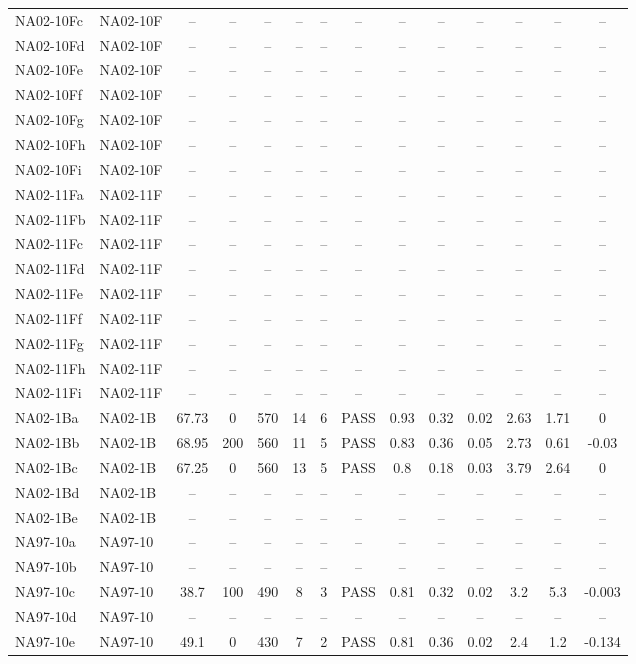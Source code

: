 \documentclass[draft]{agujournal2019}
\begin{document}
\begin{landscape}
\begin{longtable}{llcccccccccccc}
NA02-10Fc	&	NA02-10F	&	–	&	–	&	–	&	–	&	–	&	–	&	–	&	–	&	–	&	–	&	–	&	–	\\
NA02-10Fd	&	NA02-10F	&	–	&	–	&	–	&	–	&	–	&	–	&	–	&	–	&	–	&	–	&	–	&	–	\\
NA02-10Fe	&	NA02-10F	&	–	&	–	&	–	&	–	&	–	&	–	&	–	&	–	&	–	&	–	&	–	&	–	\\
NA02-10Ff	&	NA02-10F	&	–	&	–	&	–	&	–	&	–	&	–	&	–	&	–	&	–	&	–	&	–	&	–	\\
NA02-10Fg	&	NA02-10F	&	–	&	–	&	–	&	–	&	–	&	–	&	–	&	–	&	–	&	–	&	–	&	–	\\
NA02-10Fh	&	NA02-10F	&	–	&	–	&	–	&	–	&	–	&	–	&	–	&	–	&	–	&	–	&	–	&	–	\\
NA02-10Fi	&	NA02-10F	&	–	&	–	&	–	&	–	&	–	&	–	&	–	&	–	&	–	&	–	&	–	&	–	\\
NA02-11Fa	&	NA02-11F	&	–	&	–	&	–	&	–	&	–	&	–	&	–	&	–	&	–	&	–	&	–	&	–	\\
NA02-11Fb	&	NA02-11F	&	–	&	–	&	–	&	–	&	–	&	–	&	–	&	–	&	–	&	–	&	–	&	–	\\
NA02-11Fc	&	NA02-11F	&	–	&	–	&	–	&	–	&	–	&	–	&	–	&	–	&	–	&	–	&	–	&	–	\\
NA02-11Fd	&	NA02-11F	&	–	&	–	&	–	&	–	&	–	&	–	&	–	&	–	&	–	&	–	&	–	&	–	\\
NA02-11Fe	&	NA02-11F	&	–	&	–	&	–	&	–	&	–	&	–	&	–	&	–	&	–	&	–	&	–	&	–	\\
NA02-11Ff	&	NA02-11F	&	–	&	–	&	–	&	–	&	–	&	–	&	–	&	–	&	–	&	–	&	–	&	–	\\
NA02-11Fg	&	NA02-11F	&	–	&	–	&	–	&	–	&	–	&	–	&	–	&	–	&	–	&	–	&	–	&	–	\\
NA02-11Fh	&	NA02-11F	&	–	&	–	&	–	&	–	&	–	&	–	&	–	&	–	&	–	&	–	&	–	&	–	\\
NA02-11Fi	&	NA02-11F	&	–	&	–	&	–	&	–	&	–	&	–	&	–	&	–	&	–	&	–	&	–	&	–	\\
NA02-1Ba	&	NA02-1B	&	67.73	&	0	&	570	&	14	&	6	&	PASS	&	0.93	&	0.32	&	0.02	&	2.63	&	1.71	&	0	\\
NA02-1Bb	&	NA02-1B	&	68.95	&	200	&	560	&	11	&	5	&	PASS	&	0.83	&	0.36	&	0.05	&	2.73	&	0.61	&	-0.03	\\
NA02-1Bc	&	NA02-1B	&	67.25	&	0	&	560	&	13	&	5	&	PASS	&	0.8	&	0.18	&	0.03	&	3.79	&	2.64	&	0	\\
NA02-1Bd	&	NA02-1B	&	–	&	–	&	–	&	–	&	–	&	–	&	–	&	–	&	–	&	–	&	–	&	–	\\
NA02-1Be	&	NA02-1B	&	–	&	–	&	–	&	–	&	–	&	–	&	–	&	–	&	–	&	–	&	–	&	–	\\
NA97-10a	&	NA97-10	&	–	&	–	&	–	&	–	&	–	&	–	&	–	&	–	&	–	&	–	&	–	&	–	\\
NA97-10b	&	NA97-10	&	–	&	–	&	–	&	–	&	–	&	–	&	–	&	–	&	–	&	–	&	–	&	–	\\
NA97-10c	&	NA97-10	&	38.7	&	100	&	490	&	8	&	3	&	PASS	&	0.81	&	0.32	&	0.02	&	3.2	&	5.3	&	-0.003	\\
NA97-10d	&	NA97-10	&	–	&	–	&	–	&	–	&	–	&	–	&	–	&	–	&	–	&	–	&	–	&	–	\\
NA97-10e	&	NA97-10	&	49.1	&	0	&	430	&	7	&	2	&	PASS	&	0.81	&	0.36	&	0.02	&	2.4	&	1.2	&	-0.134	\\
																										

\end{longtable}
\end{landscape}
\end{document}
